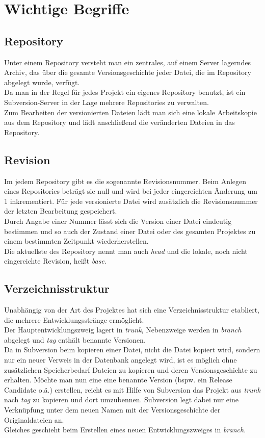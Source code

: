 \section{Wichtige Begriffe}
\subsection{Repository}
Unter einem Repository versteht man ein zentrales, auf einem Server lagerndes Archiv, das über die gesamte Versionsgeschichte jeder Datei, die im Repository abgelegt wurde, verfügt.\\
Da man in der Regel für jedes Projekt ein eigenes Repository benutzt, ist ein Subversion-Server in der Lage mehrere Repositories zu verwalten.\\
Zum Bearbeiten der versionierten Dateien lädt man sich eine lokale Arbeitskopie aus dem Repository und lädt anschließend die veränderten Dateien in das Repository.
\subsection{Revision}
Im jedem Repository gibt es die sogenannte Revisionsnummer. Beim Anlegen eines Repositories beträgt sie null und wird bei jeder eingereichten Änderung um 1 inkrementiert. Für jede versionierte Datei wird zusätzlich die Revisionsnummer der letzten Bearbeitung gespeichert.\\
Durch Angabe einer Nummer lässt sich die Version einer Datei eindeutig bestimmen und so auch der Zustand einer Datei oder des gesamten Projektes zu einem bestimmten Zeitpunkt wiederherstellen.\\
Die aktuellste des Repository nennt man auch \emph{head} und die lokale, noch nicht eingereichte Revision, heißt \emph{base}.
\subsection{Verzeichnisstruktur}
Unabhängig von der Art des Projektes hat sich eine Verzeichnisstruktur etabliert, die mehrere Entwicklungsstränge ermöglicht.\\
Der Hauptentwicklungszweig lagert in \emph{trunk}, Nebenzweige werden in \emph{branch} abgelegt und \emph{tag} enthält benannte Versionen.\\
Da in Subversion beim kopieren einer Datei, nicht die Datei kopiert wird, sondern nur ein neuer Verweis in der Datenbank angelegt wird, ist es möglich ohne zusätzlichen Speicherbedarf Dateien zu kopieren und deren Versionsgeschichte zu erhalten. Möchte man nun eine eine benannte Version (bspw. ein Release Candidate o.ä.) erstellen, reicht es mit Hilfe von Subversion das Projekt aus \emph{trunk} nach \emph{tag} zu kopieren und dort umzubennen. Subversion legt dabei nur eine Verknüpfung unter dem neuen Namen mit der Versionsgeschichte der Originaldateien an.\\
Gleiches geschieht beim Erstellen eines neuen Entwicklungszweiges in \emph{branch}.
